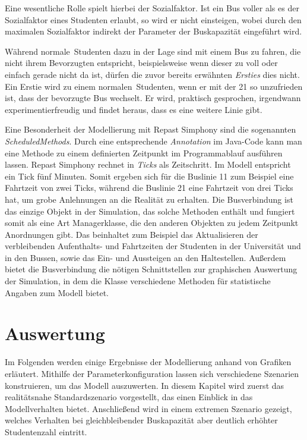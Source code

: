 \documentclass[12pt,a4paper]{scrartcl}
\begin{document}
Eine wesentliche Rolle spielt hierbei der Sozialfaktor. Ist ein Bus voller als es der Sozialfaktor eines Studenten erlaubt, so wird er nicht einsteigen, wobei durch den maximalen Sozialfaktor indirekt der Parameter der Buskapazität eingeführt wird.

Während \glqq normale\grqq~Studenten dazu in der Lage sind mit einem Bus zu fahren, die nicht ihrem Bevorzugten entspricht, beispielsweise wenn dieser zu voll oder einfach gerade nicht da ist, dürfen die zuvor bereits erwähnten \textit{Ersties} dies nicht. Ein Erstie wird zu einem \glqq normalen\grqq~Studenten, wenn er mit der 21 so unzufrieden ist, dass der bevorzugte Bus wechselt. Er wird, praktisch gesprochen, irgendwann experimentierfreudig und findet heraus, dass es eine weitere Linie gibt.

Eine Besonderheit der Modellierung mit Repast Simphony sind die sogenannten \textit{ScheduledMethods}. Durch eine entsprechende \textit{Annotation} im Java-Code kann man eine Methode zu einem definierten Zeitpunkt im Programmablauf ausführen lassen. Repast Simphony rechnet in \textit{Ticks} als Zeitschritt. Im Modell entspricht ein Tick fünf Minuten. Somit ergeben sich für die Buslinie 11 zum Beispiel eine Fahrtzeit von zwei Ticks, während die Buslinie 21 eine Fahrtzeit von drei Ticks hat, um grobe Anlehnungen an die Realität zu erhalten. Die Busverbindung ist das einzige Objekt in der Simulation, das solche Methoden enthält und fungiert somit als eine Art Managerklasse, die den anderen Objekten zu jedem Zeitpunkt Anordnungen gibt. Das beinhaltet zum Beispiel das Aktualisieren der verbleibenden Aufenthalts- und Fahrtzeiten der Studenten in der Universität und in den Bussen, sowie das Ein- und Aussteigen an den Haltestellen. Außerdem bietet die Busverbindung die nötigen Schnittstellen zur graphischen Auswertung der Simulation, in dem die Klasse verschiedene Methoden für statistische Angaben zum Modell bietet. 

\section{Auswertung}\label{erg}
Im Folgenden werden einige Ergebnisse der Modellierung anhand von Grafiken erläutert. Mithilfe der Parameterkonfiguration lassen sich verschiedene Szenarien konstruieren, um das Modell auszuwerten. In diesem Kapitel wird zuerst das realitätsnahe Standardszenario vorgestellt, das einen Einblick in das Modellverhalten bietet. Anschließend wird in einem extremen Szenario gezeigt, welches Verhalten bei gleichbleibender Buskapazität aber deutlich erhöhter Studentenzahl eintritt.
\end{document}
